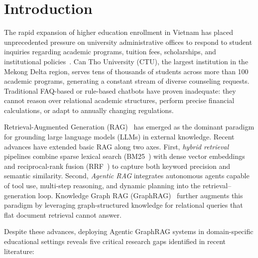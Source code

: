 \documentclass[runningheads]{llncs}
\begin{document}
\section{Introduction}
\label{sec:introduction}

The rapid expansion of higher education enrollment in Vietnam has placed unprecedented pressure on university administrative offices to respond to student inquiries regarding academic programs, tuition fees, scholarships, and institutional policies~\cite{lewis2020rag}. Can Tho University (CTU), the largest institution in the Mekong Delta region, serves tens of thousands of students across more than 100 academic programs, generating a constant stream of diverse counseling requests. Traditional FAQ-based or rule-based chatbots have proven inadequate: they cannot reason over relational academic structures, perform precise financial calculations, or adapt to annually changing regulations.

Retrieval-Augmented Generation (RAG)~\cite{lewis2020rag} has emerged as the dominant paradigm for grounding large language models (LLMs) in external knowledge. Recent advances have extended basic RAG along two axes. First, \emph{hybrid retrieval} pipelines combine sparse lexical search (BM25~\cite{robertson2009bm25}) with dense vector embeddings and reciprocal-rank fusion (RRF~\cite{cormack2009rrf}) to capture both keyword precision and semantic similarity. Second, \emph{Agentic RAG} integrates autonomous agents capable of tool use, multi-step reasoning, and dynamic planning into the retrieval--generation loop. Knowledge Graph RAG (GraphRAG)~\cite{edge2024graphrag} further augments this paradigm by leveraging graph-structured knowledge for relational queries that flat document retrieval cannot answer.

Despite these advances, deploying Agentic GraphRAG systems in domain-specific educational settings reveals five critical research gaps identified in recent literature:
\end{document}
